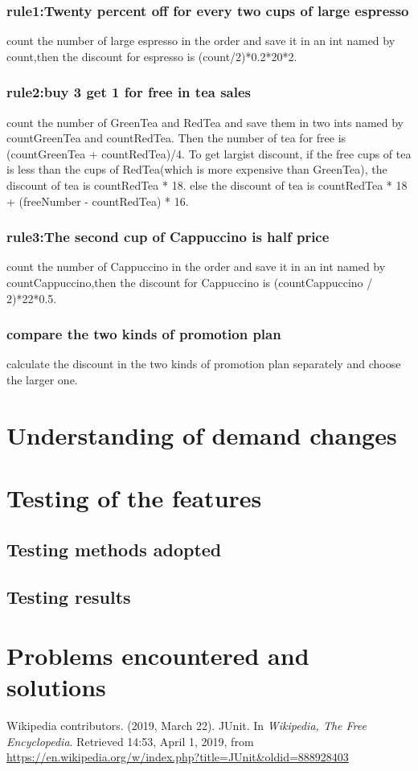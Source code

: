 \documentclass[a4paper]{report}
\begin{document}
\subsection{rule1:Twenty percent off for every two cups of large espresso}
count the number of large espresso in the order and save it in an int named by count,then the discount for espresso is (count/2)*0.2*20*2.
\subsection{rule2:buy 3 get 1 for free in tea sales}
count the number of GreenTea and RedTea and  save them in two ints named by countGreenTea and countRedTea.
Then the number of tea for free is (countGreenTea + countRedTea)/4.
To get largist discount, if the free cups of tea is less than the cups of RedTea(which is more expensive than GreenTea),
the discount of tea is countRedTea * 18. else the discount of tea is countRedTea * 18 + (freeNumber - countRedTea) * 16.
\subsection{rule3:The second cup of Cappuccino is half price}
count the number of Cappuccino in the order and save it in an int named by countCappuccino,then the discount for Cappuccino is (countCappuccino / 2)*22*0.5.
\subsection{compare the two kinds of promotion plan}
calculate the discount in the two kinds of promotion plan separately and choose the larger one.


\chapter{Understanding of demand changes}
\chapter{Testing of the features}
\section{Testing methods adopted}
% 
% 
% 
\section{Testing results}
% 
% 
% 

\chapter{Problems encountered and solutions}
\begin{thebibliography}{A}

Wikipedia contributors. (2019, March 22). JUnit. In \emph{Wikipedia, The Free Encyclopedia}. Retrieved 14:53, April 1, 2019, from \url{https://en.wikipedia.org/w/index.php?title=JUnit&oldid=888928403}

\end{thebibliography}
\end{document}
